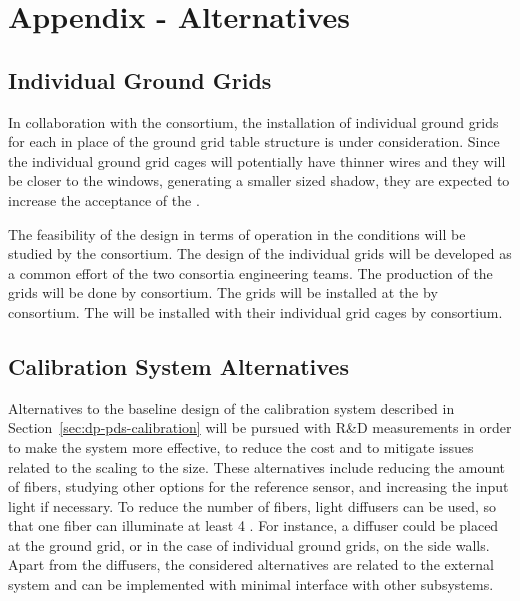 \section{Appendix - Alternatives}
\label{sec:dp-pds-appendix}

\subsection{Individual Ground Grids}
\label{sec:dp-pds-appendix-grid}

In collaboration with the  consortium, the installation of individual ground grids for each  in place of the ground grid table structure is under consideration. Since the individual ground grid cages will potentially have thinner wires and they will be closer to the  windows, generating a smaller sized shadow, they are expected to increase the acceptance of the .

The feasibility of the design in terms of operation in the \dune \dual conditions will be studied by the  consortium. The design of the individual grids will be developed as a common effort of the two consortia engineering teams. The production of the grids will be done by  consortium. The grids will be installed at the  by \dual {} consortium. The  will be installed with their individual grid cages by \dual {} consortium. 

\subsection{Calibration System Alternatives}
\label{sec:dp-pds-appendix-calibration}

Alternatives to the baseline design of the calibration system described in Section~\ref{sec:dp-pds-calibration} will be pursued with R\&D measurements in order to make the system more effective, to reduce the cost and to mitigate issues related to the scaling to the \dune \dual size. These alternatives include reducing the amount of fibers, studying other options for the reference sensor, and increasing the input light if necessary. To reduce the number of fibers, light diffusers can be used, so that one fiber can illuminate at least 4 . For instance, a diffuser could be placed at the ground grid, or in the case of individual ground grids, on the side walls. Apart from the diffusers, the considered alternatives are related to the external system and can be implemented with minimal interface with other subsystems.

